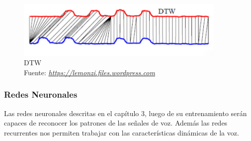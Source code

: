 \begin{figure}[H]
	\centering
	\includegraphics[width=0.9\textwidth]{Figures/dtw.png}
	\caption{DTW\\ Fuente:  \href{https://lemonzi.files.wordpress.com/2013/01/dtw.pdf}{\textit{https://lemonzi.files.wordpress.com}}}
	\label{onda}
\end{figure} 

\subsubsection{Redes Neuronales}
Las redes neuronales descritas en el capítulo 3, luego de su entrenamiento serán capaces de reconocer los patrones de las señales de voz. Además las redes recurrentes nos permiten trabajar con las características dinámicas de la voz.